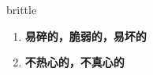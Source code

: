 
\begin{frame}
{\huge brittle}
\begin{center}
\begin{enumerate}\Large
  \item \textbf{易碎的，脆弱的，易坏的}
  \item \textbf{不热心的，不真心的}
\end{enumerate}
\end{center}
\end{frame}
